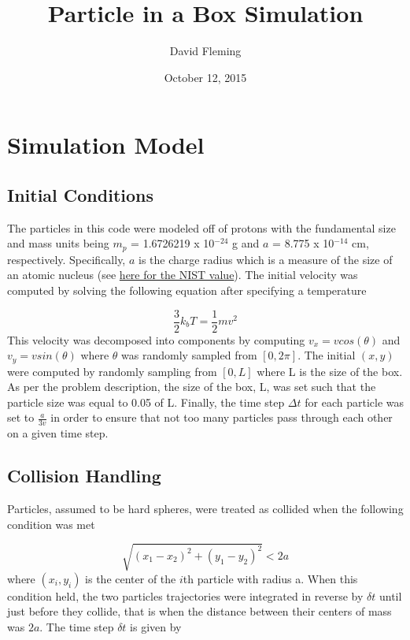 \documentclass[12pt]{amsart}
\title{Particle in a Box Simulation}
\author{David Fleming}
\date{October 12, 2015} %
\begin{document}
\maketitle


\section{Simulation Model}
\subsection{Initial Conditions}

The particles in this code were modeled off of protons with the fundamental size and mass units being $m_p$ = 1.6726219 x 10$^{-24}$ g and $a$ = 8.775 x 10$^{-14}$ cm, respectively.  Specifically, $a$ is the charge radius which is a measure of the size of an atomic nucleus (see \href{http://physics.nist.gov/cgi-bin/cuu/Value?rp}{here for the NIST value}).  The initial velocity was computed by solving the following equation after specifying a temperature 

$$ \frac{3}{2} k_b T = \frac{1}{2} m v^2 $$
\newline
  This velocity was decomposed into components by computing $v_x = vcos(\theta)$ and $v_y = vsin(\theta)$ where $\theta$ was randomly sampled from $[0,2 \pi]$. The initial $(x,y)$  were computed by randomly sampling from $[0,L]$ where L is the size of the box.  As per the problem description, the size of the box, L, was set such that the particle size was equal to 0.05 of L.  Finally, the time step $\Delta t$ for each particle was set to $\frac{a}{3v}$ in order to ensure that not too many particles pass through each other on a given time step.

\subsection{Collision Handling}

Particles, assumed to be hard spheres, were treated as collided when the following condition was met

$$ \sqrt{(x_1 - x_2)^2 + (y_1 - y_2)^2} < 2a  $$ 
\newline
where $(x_i,y_i)$ is the center of the $i$th particle with radius a.  When this condition held, the two particles trajectories were integrated in reverse by $\delta t$ until just before they collide, that is when the distance between their centers of mass was $2a$.  The time step $\delta t$ is given by 
\end{document}
